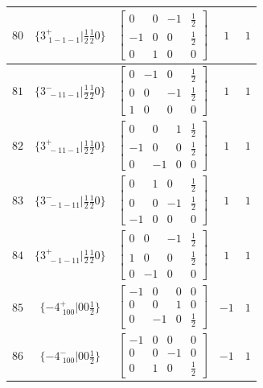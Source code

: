 \documentclass[fleqn,8pt]{jsarticle}
\begin{document}
\begin{longtable}{ccccc}
$ 80 $ & $ \{3^{+}_{\,\,1-1-1}|\frac{1}{2} \frac{1}{2} 0\} $ & $ \begin{bmatrix} 0 & 0 & -1 & \frac{1}{2} \\ -1 & 0 & 0 & \frac{1}{2} \\ 0 & 1 & 0 & 0 \end{bmatrix} $ & $ 1 $ & $ 1 $ \\ \hline
$ 81 $ & $ \{3^{-}_{\,\,-11-1}|\frac{1}{2} \frac{1}{2} 0\} $ & $ \begin{bmatrix} 0 & -1 & 0 & \frac{1}{2} \\ 0 & 0 & -1 & \frac{1}{2} \\ 1 & 0 & 0 & 0 \end{bmatrix} $ & $ 1 $ & $ 1 $ \\ \hline
$ 82 $ & $ \{3^{+}_{\,\,-11-1}|\frac{1}{2} \frac{1}{2} 0\} $ & $ \begin{bmatrix} 0 & 0 & 1 & \frac{1}{2} \\ -1 & 0 & 0 & \frac{1}{2} \\ 0 & -1 & 0 & 0 \end{bmatrix} $ & $ 1 $ & $ 1 $ \\ \hline
$ 83 $ & $ \{3^{-}_{\,\,-1-11}|\frac{1}{2} \frac{1}{2} 0\} $ & $ \begin{bmatrix} 0 & 1 & 0 & \frac{1}{2} \\ 0 & 0 & -1 & \frac{1}{2} \\ -1 & 0 & 0 & 0 \end{bmatrix} $ & $ 1 $ & $ 1 $ \\ \hline
$ 84 $ & $ \{3^{+}_{\,\,-1-11}|\frac{1}{2} \frac{1}{2} 0\} $ & $ \begin{bmatrix} 0 & 0 & -1 & \frac{1}{2} \\ 1 & 0 & 0 & \frac{1}{2} \\ 0 & -1 & 0 & 0 \end{bmatrix} $ & $ 1 $ & $ 1 $ \\ \hline
$ 85 $ & $ \{-4^{+}_{\,\,100}|0 0 \frac{1}{2}\} $ & $ \begin{bmatrix} -1 & 0 & 0 & 0 \\ 0 & 0 & 1 & 0 \\ 0 & -1 & 0 & \frac{1}{2} \end{bmatrix} $ & $ -1 $ & $ 1 $ \\ \hline
$ 86 $ & $ \{-4^{-}_{\,\,100}|0 0 \frac{1}{2}\} $ & $ \begin{bmatrix} -1 & 0 & 0 & 0 \\ 0 & 0 & -1 & 0 \\ 0 & 1 & 0 & \frac{1}{2} \end{bmatrix} $ & $ -1 $ & $ 1 $ \\ \hline

\end{longtable}
\end{document}
